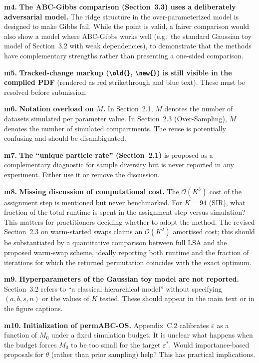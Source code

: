 \documentclass[11pt,a4paper]{article}
\newcommand{\minor}[1]{\textbf{\color{orange!80!black}m#1.}}
\begin{document}
\minor{4} \textbf{The ABC-Gibbs comparison (Section~3.3) uses a deliberately adversarial model.} The ridge structure in the over-parameterized model is designed to make Gibbs fail. While the point is valid, a fairer comparison would also show a model where ABC-Gibbs works well (e.g.\ the standard Gaussian toy model of Section~3.2 with weak dependencies), to demonstrate that the methods have complementary strengths rather than presenting a one-sided comparison.

\minor{5} \textbf{Tracked-change markup (\texttt{\textbackslash old\{\}}, \texttt{\textbackslash new\{\}}) is still visible in the compiled PDF} (rendered as red strikethrough and blue text). These must be resolved before submission.

\minor{6} \textbf{Notation overload on $M$.} In Section~2.1, $M$ denotes the number of datasets simulated per parameter value. In Section~2.3 (Over-Sampling), $M$ denotes the number of simulated compartments. The reuse is potentially confusing and should be disambiguated.

\minor{7} \textbf{The ``unique particle rate'' (Section~2.1)} is proposed as a complementary diagnostic for sample diversity but is never reported in any experiment. Either use it or remove the discussion.

\minor{8} \textbf{Missing discussion of computational cost.} The $\mathcal{O}(K^3)$ cost of the assignment step is mentioned but never benchmarked. For $K = 94$ (SIR), what fraction of the total runtime is spent in the assignment step versus simulation? This matters for practitioners deciding whether to adopt the method. The revised Section~2.3 on warm-started swaps claims an $\mathcal{O}(K^2)$ amortised cost; this should be substantiated by a quantitative comparison between full \textsc{LSA} and the proposed warm-swap scheme, ideally reporting both runtime and the fraction of iterations for which the returned permutation coincides with the exact optimum.

\minor{9} \textbf{Hyperparameters of the Gaussian toy model are not reported.} Section~3.2 refers to ``a classical hierarchical model'' without specifying $(a,b,s,n)$ or the values of $K$ tested. These should appear in the main text or in the figure captions.

\minor{10} \textbf{Initialization of permABC-OS.} Appendix~C.2 calibrates $\varepsilon$ as a function of $M_0$ under a fixed simulation budget. It is unclear what happens when the budget forces $M_0$ to be too small for the target $\varepsilon^*$. Would importance-based proposals for $\theta$ (rather than prior sampling) help? This has practical implications.
\end{document}
